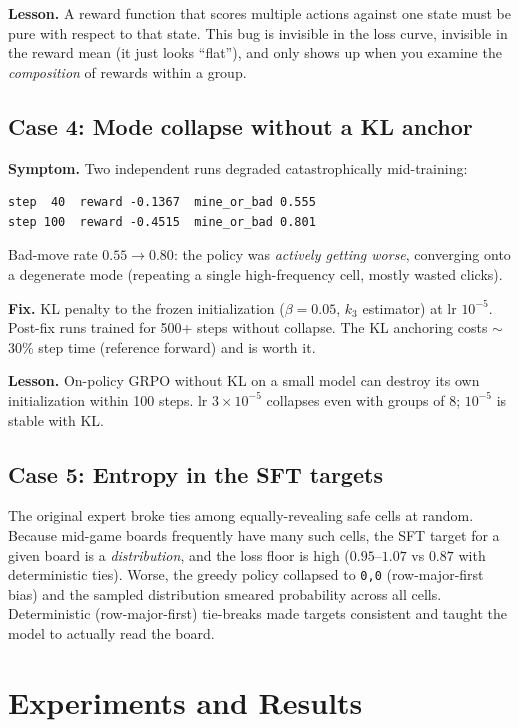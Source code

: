 \documentclass[11pt]{article}
\begin{document}
\textbf{Lesson.} A reward function that scores multiple actions against one
state must be pure with respect to that state. This bug is invisible in the
loss curve, invisible in the reward mean (it just looks ``flat''), and only
shows up when you examine the \emph{composition} of rewards within a group.

\subsection{Case 4: Mode collapse without a KL anchor}
\label{sec:bug-collapse}
\textbf{Symptom.} Two independent runs degraded catastrophically mid-training:
\begin{lstlisting}[language={}, caption={KL-free run collapsing (lr 3e-5 and 1e-5 alike).}]
step  40  reward -0.1367  mine_or_bad 0.555
step 100  reward -0.4515  mine_or_bad 0.801
\end{lstlisting}
Bad-move rate $0.55 \to 0.80$: the policy was \emph{actively getting worse},
converging onto a degenerate mode (repeating a single high-frequency cell,
mostly wasted clicks).

\textbf{Fix.} KL penalty to the frozen initialization ($\beta = 0.05$, $k_3$
estimator) at lr $10^{-5}$. Post-fix runs trained for 500+ steps without
collapse. The KL anchoring costs $\sim$30\% step time (reference forward) and
is worth it.

\textbf{Lesson.} On-policy GRPO without KL on a small model can destroy its
own initialization within 100 steps. lr $3{\times}10^{-5}$ collapses even
with groups of 8; $10^{-5}$ is stable with KL.

\subsection{Case 5: Entropy in the SFT targets}
\label{sec:bug-ties}
The original expert broke ties among equally-revealing safe cells at random.
Because mid-game boards frequently have many such cells, the SFT target for
a given board is a \emph{distribution}, and the loss floor is high
($0.95$--$1.07$ vs $0.87$ with deterministic ties). Worse, the greedy policy
collapsed to \texttt{0,0} (row-major-first bias) and the sampled distribution
smeared probability across all cells. Deterministic (row-major-first)
tie-breaks made targets consistent and taught the model to actually read the
board.

\section{Experiments and Results}
\label{sec:results}
\end{document}
